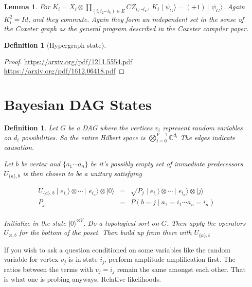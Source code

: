 \documentclass[11pt]{article}
\theoremstyle{change}
\newtheorem{definition}[equation]{Definition}
\newtheorem{lemma}[equation]{Lemma}
\theoremstyle{nonumberplain}
\newtheorem{proof}{Proof}
\numberwithin{equation}{section}
\newcommand\ket[1]{\mid #1 \rangle}
\newcommand\setof[1]{\{ #1 \}}
\begin{document}
\begin{lemma}
For $K_i = X_i \otimes \prod_{(i,i_2 \cdots i_k) \in E} CZ_{i_2 \cdots i_k}$, $K_i \ket{\psi_G} = (+1)\ket{\psi_G}$. Again $K_i^2 = Id$, and they commute. Again they form an independent set in the sense of the Coxeter graph as the general program described in the Coxeter compiler paper.
\end{lemma}

\begin{definition}[Hypergraph state]
\end{definition}

\begin{proof}
\url{https://arxiv.org/pdf/1211.5554.pdf}
\url{https://arxiv.org/pdf/1612.06418.pdf}
\end{proof}

\section{Bayesian DAG States}

\begin{definition}
Let $G$ be a DAG where the vertices $v_i$ represent random variables on $d_i$ possibilities. So the entire Hilbert space is $\bigotimes_{i=0}^{V-1} \mathbb{C}^{d_i}$ The edges indicate causation.

Let $b$ be vertex and $\setof{a_1 \cdots a_n}$ be it's possibly empty set of immediate predecessors $U_{\setof{a},b}$ is then chosen to be a unitary satisfying

\begin{eqnarray*}
U_{\setof{a},b} \ket{e_{i_1}} \otimes \cdots \ket{e_{i_n}} \otimes \ket{0} &=& \sqrt{P_j} \ket{e_{i_1}} \otimes \cdots \ket{e_{i_n}} \otimes \ket{j}\\
P_j &=& P( b = j \mid a_1 = i_1 \cdots a_n = i_n )\\
\end{eqnarray*}

Initialize in the state $\ket{0}^{\otimes V}$. Do a topological sort on $G$. Then apply the operators $U_{\varnothing, b}$ for the bottom of the poset. Then build up from there with $U_{\setof{a},b}$

\end{definition}

If you wish to ask a question conditioned on some variables like the random variable for vertex $v_j$ is in state $i_j$, perform amplitude amplification first. The ratios between the terms with $v_j = i_j$ remain the same amongst each other. That is what one is probing anyways. Relative likelihoods.
\end{document}
